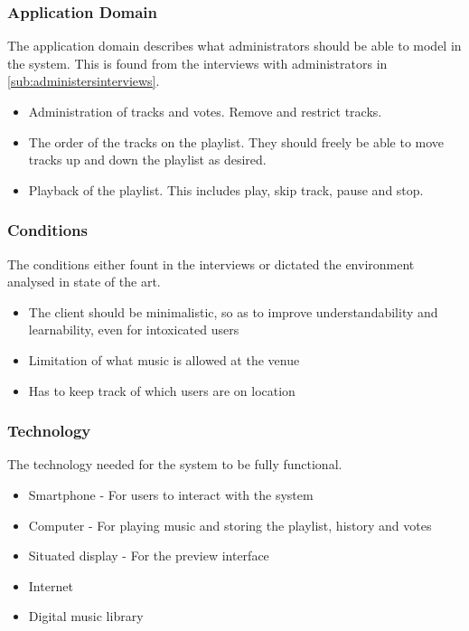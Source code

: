 \subsubsection{Application Domain}
The application domain describes what administrators should be able to model in the system. This is found from the interviews with administrators in \cref{sub:administersinterviews}.
\begin{itemize}
    \item Administration of tracks and votes. Remove and restrict tracks.
    \item The order of the tracks on the playlist. They should freely be able to move tracks up and down the playlist as desired.
    \item Playback of the playlist. This includes play, skip track, pause and stop.
\end{itemize}

\subsubsection{Conditions}
The conditions either fount in the interviews or dictated the environment analysed in state of the art.
\begin{itemize}
  \item The client should be minimalistic, so as to improve understandability and learnability, even for intoxicated users
  \item Limitation of what music is allowed at the venue
  \item Has to keep track of which users are on location
\end{itemize}

\subsubsection{Technology}
The technology needed for the system to be fully functional.
\begin{itemize}
    \item Smartphone - For users to interact with the system
    \item Computer - For playing music and storing the playlist, history and votes
		\item Situated display - For the preview interface
    \item Internet
    \item Digital music library
\end{itemize}

